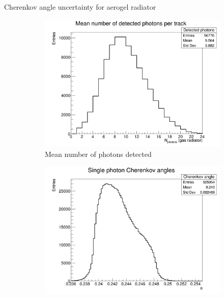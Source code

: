 \documentclass{beamer}
\begin{document}
\begin{frame}{Cherenkov angle uncertainty for aerogel radiator}
  \begin{figure}
    \centering
    \vspace{-0.2cm}
    \begin{subfigure}{0.35\textwidth}
      \includegraphics[width = 1.0\textwidth]{Plots/NumberDetectedPhotons_Barrel_Aerogel.png}
      \vspace{-0.75cm}
      \caption{Mean number of photons detected}
    \end{subfigure}
    \begin{subfigure}{0.35\textwidth}
      \includegraphics[width = 1.0\textwidth]{Plots/SinglePhotonCherenkovAngles_Barrel_Aerogel.png}
      \vspace{-0.75cm}

\end{subfigure}
\end{figure}
\end{frame}
\end{document}
